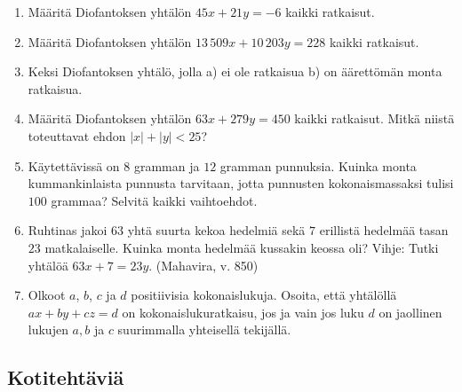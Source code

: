 \begin{enumerate}
\item Määritä Diofantoksen yhtälön $45x + 21y = -6$ kaikki ratkaisut.

\item Määritä Diofantoksen yhtälön $13\, 509x + 10\, 203y = 228$ kaikki ratkaisut.

\item Keksi Diofantoksen yhtälö, jolla a) ei ole ratkaisua b) on äärettömän monta ratkaisua.

\item Määritä Diofantoksen yhtälön $63x + 279y = 450$ kaikki ratkaisut. Mitkä niistä toteuttavat ehdon $|x| + |y| < 25$?

\item Käytettävissä on $8$ gramman ja $12$ gramman punnuksia. Kuinka monta kummankinlaista punnusta tarvitaan, jotta punnusten kokonaismassaksi tulisi $100$ grammaa? Selvitä kaikki vaihtoehdot. 

\item Ruhtinas jakoi $63$ yhtä suurta kekoa hedelmiä sekä $7$ erillistä hedelmää tasan $23$ matkalaiselle. Kuinka monta hedelmää kussakin keossa oli? Vihje: Tutki yhtälöä $63x + 7 = 23y$. (Mahavira, v. 850)

\item Olkoot $a$, $b$, $c$ ja $d$ positiivisia kokonaislukuja. Osoita, että yhtälöllä $ax+by+cz=d$ on kokonaislukuratkaisu, jos ja vain jos luku $d$ on jaollinen lukujen $a, b$ ja $c$ suurimmalla yhteisellä tekijällä. 

\end{enumerate}

\subsection*{Kotitehtäviä}

